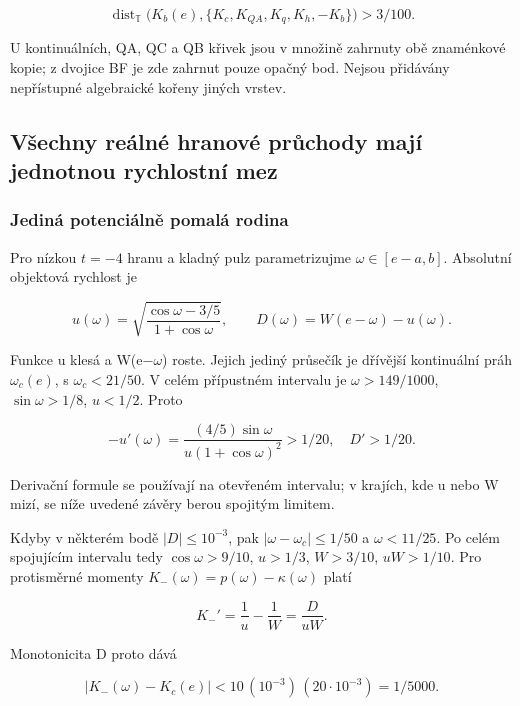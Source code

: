 \documentclass[11pt,a4paper]{article}
\theoremstyle{remark}\newtheorem{remark}[theorem]{Poznámka}
\numberwithin{equation}{section}
\begin{document}
\[
\operatorname{dist}_{\mathbb T}
\bigl(K_b(e),\{K_c,K_{QA},K_q,K_h,-K_b\}\bigr)>3/100.
\tag{CG18}
\]

U kontinuálních, QA, QC a QB křivek jsou v množině zahrnuty obě
znaménkové kopie; z dvojice BF je zde zahrnut pouze opačný bod. Nejsou
přidávány nepřístupné algebraické kořeny jiných vrstev.

\hypertarget{vux161echny-reuxe1lnuxe9-hranovuxe9-prux16fchody-majuxed-jednotnou-rychlostnuxed-mez}{%
\subsection{Všechny reálné hranové průchody mají jednotnou rychlostní
mez}\label{vux161echny-reuxe1lnuxe9-hranovuxe9-prux16fchody-majuxed-jednotnou-rychlostnuxed-mez}}

\hypertarget{jedinuxe1-potenciuxe1lnux11b-pomaluxe1-rodina}{%
\subsubsection{Jediná potenciálně pomalá
rodina}\label{jedinuxe1-potenciuxe1lnux11b-pomaluxe1-rodina}}

Pro nízkou \(t=-4\) hranu a kladný pulz parametrizujme
\(\omega\in[e-a,b]\). Absolutní objektová rychlost je

\[
u(\omega)=
\sqrt{\frac{\cos\omega-3/5}{1+\cos\omega}},
\qquad D(\omega)=W(e-\omega)-u(\omega).
\tag{CG19}
\]

Funkce u klesá a W(e−\(\omega\)) roste. Jejich jediný průsečík je
dřívější kontinuální práh \(\omega_c(e)\), s \(\omega_c<21/50\). V celém
přípustném intervalu je \(\omega>149/1000\), \(\sin\omega>1/8\),
\(u<1/2\). Proto

\[
-u'(\omega)
=\frac{(4/5)\sin\omega}{u(1+\cos\omega)^2}>1/20,
\quad D'>1/20.
\tag{CG20}
\]

Derivační formule se používají na otevřeném intervalu; v krajích, kde u
nebo W mizí, se níže uvedené závěry berou spojitým limitem.

Kdyby v některém bodě \(|D|\le10^{-3}\), pak
\(|\omega-\omega_c|\le1/50\) a \(\omega<11/25\). Po celém spojujícím
intervalu tedy \(\cos\omega>9/10\), \(u>1/3\), \(W>3/10\), \(uW>1/10\).
Pro protisměrné momenty \(K_-(\omega)=p(\omega)-\kappa(\omega)\) platí

\[
K_-'=\frac1u-\frac1W=\frac{D}{uW}.
\]

Monotonicita D proto dává

\[
|K_-(\omega)-K_c(e)|
<10\,(10^{-3})\,(20\cdot10^{-3})=1/5000.
\]
\end{document}
